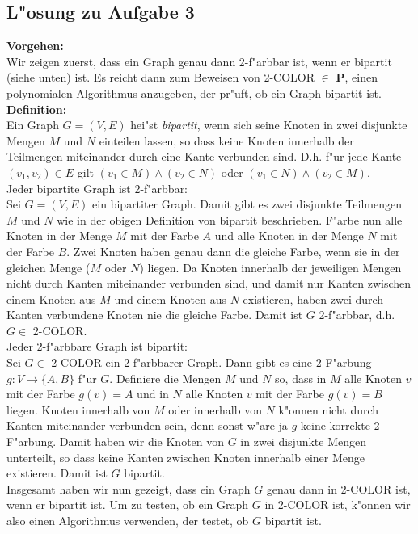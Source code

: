 \documentclass[10pt,oneside,onecolumn,a4paper,german,titlepage]{article}
\begin{document}
\subsection*{L"osung zu Aufgabe 3}
\textbf{Vorgehen:}\\
Wir zeigen zuerst, dass ein Graph genau dann 2-f"arbbar ist, wenn er bipartit
(siehe unten) ist. Es reicht dann zum Beweisen von 2-COLOR $\in$ \textbf{P}, einen
polynomialen Algorithmus anzugeben, der pr"uft, ob ein Graph bipartit ist.\\[4pt]
\textbf{Definition:}\\
Ein Graph $G = (V,E)$ hei"st \textit{bipartit}, wenn sich seine Knoten in zwei
disjunkte Mengen $M$ und $N$ einteilen lassen, so dass keine Knoten innerhalb der
Teilmengen miteinander durch eine Kante verbunden sind. D.h. f"ur jede Kante
$(v_1, v_2) \in E$ gilt $(v_1 \in M) \wedge (v_2 \in N)$ oder $(v_1 \in N) \wedge
(v_2 \in M)$.\\[4pt]
Jeder bipartite Graph ist 2-f"arbbar:\\
Sei $G = (V,E)$ ein bipartiter Graph. Damit gibt es zwei disjunkte Teilmengen $M$ und
$N$ wie in der obigen Definition von bipartit beschrieben. F"arbe nun alle Knoten in
der Menge $M$ mit der Farbe $A$ und alle Knoten in der Menge $N$ mit der Farbe $B$.
Zwei Knoten haben genau dann die gleiche Farbe, wenn sie in der gleichen Menge ($M$
oder $N$) liegen. Da Knoten innerhalb der jeweiligen Mengen nicht durch Kanten
miteinander verbunden sind, und damit nur Kanten zwischen einem Knoten aus $M$ und
einem Knoten aus $N$ existieren, haben zwei durch Kanten verbundene Knoten nie die
gleiche Farbe. Damit ist $G$ 2-f"arbbar, d.h. $G \in$ 2-COLOR.\\[4pt]
Jeder 2-f"arbbare Graph ist bipartit:\\
Sei $G \in$ 2-COLOR ein 2-f"arbbarer Graph. Dann gibt es eine 2-F"arbung $g: V \to
\{A,B\}$ f"ur $G$. Definiere die Mengen $M$ und $N$ so, dass in $M$ alle Knoten $v$
mit der Farbe $g(v) = A$ und in $N$ alle Knoten $v$ mit der Farbe $g(v) = B$ liegen.
Knoten innerhalb von $M$ oder innerhalb von $N$ k"onnen nicht durch Kanten
miteinander verbunden sein, denn sonst w"are ja $g$ keine korrekte 2-F"arbung. Damit
haben wir die Knoten von $G$ in zwei disjunkte Mengen unterteilt, so dass keine
Kanten zwischen Knoten innerhalb einer Menge existieren. Damit ist $G$ bipartit.
\\[4pt]
Insgesamt haben wir nun gezeigt, dass ein Graph $G$ genau dann in 2-COLOR ist, wenn
er bipartit ist. Um zu testen, ob ein Graph $G$ in 2-COLOR ist, k"onnen wir also
einen Algorithmus verwenden, der testet, ob $G$ bipartit ist.
\end{document}
